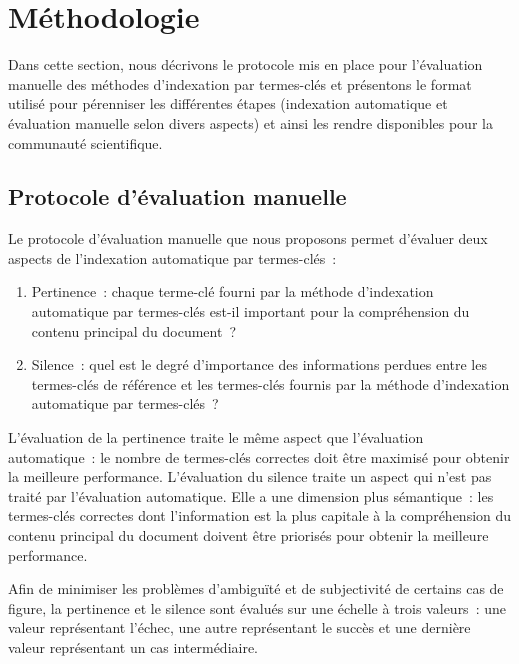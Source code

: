 
  \section{Méthodologie}
  \label{section:main-automatic_evaluation_of_keyphrase_annotation-methodology}
    Dans cette section, nous décrivons le protocole mis en place pour
    l'évaluation manuelle des méthodes d'indexation par termes-clés et
    présentons le format utilisé pour pérenniser les différentes étapes
    (indexation automatique et évaluation manuelle selon divers aspects) et
    ainsi les rendre disponibles pour la communauté scientifique.

    \subsection{Protocole d'évaluation manuelle}
    \label{subsec:main-automatic_evaluation_of_keyphrase_annotation-methodology-evaluation_protocol}
      Le protocole d'évaluation manuelle que nous proposons permet d'évaluer
      deux aspects de l'indexation automatique par termes-clés~:
      \begin{enumerate}
        \item{Pertinence~: chaque terme-clé fourni par la méthode d'indexation
              automatique par termes-clés est-il important pour la compréhension
              du contenu principal du document~?}
        \item{Silence~: quel est le degré d'importance des informations perdues
              entre les termes-clés de référence et les termes-clés fournis par
              la méthode d'indexation automatique par termes-clés~?}
      \end{enumerate}
      L'évaluation de la pertinence traite le même aspect que l'évaluation
      automatique~: le nombre de termes-clés correctes doit être maximisé pour
      obtenir la meilleure performance. L'évaluation du silence traite un aspect
      qui n'est pas traité par l'évaluation automatique. Elle a une dimension
      plus sémantique~: les termes-clés correctes dont l'information est la plus
      capitale à la compréhension du contenu principal du document doivent être
      priorisés pour obtenir la meilleure performance.

      Afin de minimiser les problèmes d'ambiguïté et de subjectivité de certains
      cas de figure, la pertinence et le silence sont évalués sur une échelle à
      trois valeurs~: une valeur représentant l'échec, une autre représentant le
      succès et une dernière valeur représentant un cas intermédiaire.

